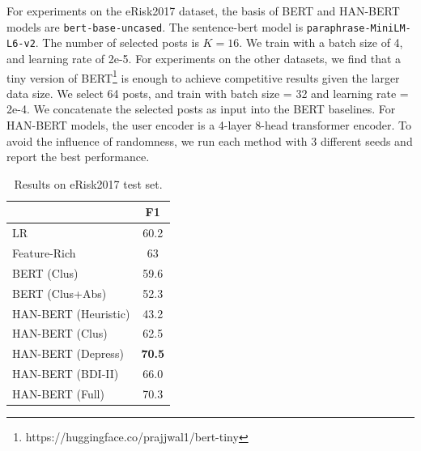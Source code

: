 For experiments on the eRisk2017 dataset, the basis of BERT and HAN-BERT models are \texttt{bert-base-uncased}. The sentence-bert model is \texttt{paraphrase-MiniLM-L6-v2}. The number of selected posts is $K=16$. We train with a batch size of 4, and learning rate of 2e-5. For experiments on the other datasets, we find that a tiny version of BERT\footnote{https://huggingface.co/prajjwal1/bert-tiny} is enough to achieve competitive results given the larger data size. We select 64 posts, and train with batch size = 32 and learning rate = 2e-4. We concatenate the selected posts as input into the BERT baselines. For HAN-BERT models, the user encoder is a 4-layer 8-head transformer encoder. To avoid the influence of randomness, we run each method with 3 different seeds and report the best performance.

\begin{table}[t]
    \centering
    \small
    \begin{tabular}{l|c}
        \hline
        {} & F1 \\
        \hline
        LR & 60.2 \\
        Feature-Rich & 63 \\
        \hline
        BERT (Clus) & 59.6 \\
        BERT (Clus+Abs) & 52.3 \\
        HAN-BERT (Heuristic) & 43.2 \\
        HAN-BERT (Clus) & 62.5 \\
        \hline
        HAN-BERT (Depress) & \textbf{70.5} \\
        HAN-BERT (BDI-II) & 66.0 \\
        HAN-BERT (Full) & 70.3 \\
        \hline
    \end{tabular}
    \caption{\label{table:erisk2017} Results on eRisk2017 test set.}
\end{table}


